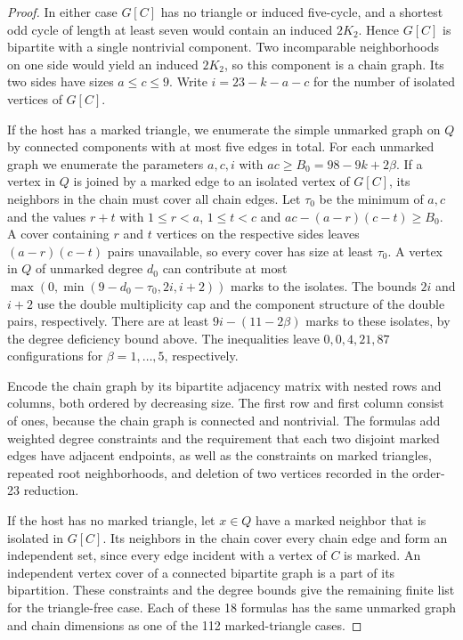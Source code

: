 \documentclass[preprint,11pt,numbers]{elsarticle-arxiv}
\numberwithin{equation}{section}
\theoremstyle{definition}
\begin{document}
\begin{proof}
In either case $G[C]$ has no triangle or induced five-cycle, and
a shortest odd cycle of length at least seven would contain an
induced $2K_2$. Hence $G[C]$ is bipartite with a single nontrivial component.
Two incomparable neighborhoods on one side would yield an
induced $2K_2$, so this component is a chain graph. Its two
sides have sizes $a\le c\le9$. Write $i=23-k-a-c$ for the
number of isolated vertices of $G[C]$.

If the host has a marked triangle, we enumerate the simple
unmarked graph on $Q$ by connected components with at most
five edges in total. For each unmarked graph we enumerate
the parameters $a,c,i$ with $ac\ge B_0=98-9k+2\beta$.
If a vertex in $Q$ is joined by a marked edge to an isolated vertex
of $G[C]$, its neighbors in the chain must cover all chain edges.
Let $\tau_0$
be the minimum of $a,c$ and the values $r+t$ with
$1\le r<a$, $1\le t<c$ and $ac-(a-r)(c-t)\ge B_0$.
A cover containing $r$ and $t$ vertices on the respective
sides leaves $(a-r)(c-t)$ pairs unavailable, so every cover
has size at least $\tau_0$. A vertex in $Q$ of unmarked
degree $d_0$ can contribute at most
$\max(0,\min(9-d_0-\tau_0,2i,i+2))$ marks to the isolates.
The bounds $2i$ and $i+2$ use the double multiplicity cap
and the component structure of the double pairs,
respectively. There are at least $9i-(11-2\beta)$ marks
to these isolates, by the degree deficiency bound above.
The inequalities leave $0,0,4,21,87$ configurations for
$\beta=1,\ldots,5$, respectively.

Encode the chain graph by its bipartite adjacency matrix
with nested rows and columns, both ordered by decreasing
size. The first row and first column consist of ones,
because the chain graph is connected and nontrivial.
The formulas add weighted degree constraints and the
requirement that each two disjoint marked edges have adjacent endpoints, as well as
the constraints on marked triangles, repeated root
neighborhoods, and deletion of two vertices recorded in
the order-23 reduction.

If the host has no marked triangle, let $x\in Q$ have a marked neighbor
that is isolated in $G[C]$. Its neighbors in the chain cover every
chain edge and form an independent set, since every edge incident
with a vertex of $C$ is marked. An
independent vertex cover of a connected bipartite graph
is a part of its bipartition. These constraints and the
degree bounds give the remaining finite list for the triangle-free
case. Each of these 18 formulas has the same unmarked graph and
chain dimensions as one of the 112 marked-triangle cases.


\end{proof}
\end{document}
